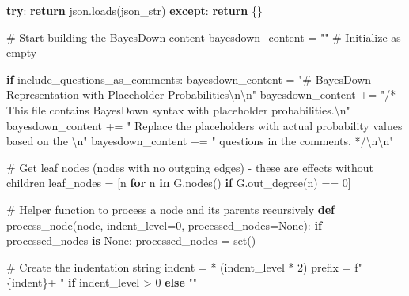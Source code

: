 \documentclass[
  11pt,
  letterpaper,
]{book}
\newenvironment{Shaded}{\begin{snugshade}}{\end{snugshade}}
\newcommand{\BuiltInTok}[1]{\textcolor[rgb]{0.00,0.23,0.31}{#1}}
\newcommand{\CharTok}[1]{\textcolor[rgb]{0.13,0.47,0.30}{#1}}
\newcommand{\CommentTok}[1]{\textcolor[rgb]{0.37,0.37,0.37}{#1}}
\newcommand{\ControlFlowTok}[1]{\textcolor[rgb]{0.00,0.23,0.31}{\textbf{#1}}}
\newcommand{\DecValTok}[1]{\textcolor[rgb]{0.68,0.00,0.00}{#1}}
\newcommand{\KeywordTok}[1]{\textcolor[rgb]{0.00,0.23,0.31}{\textbf{#1}}}
\newcommand{\NormalTok}[1]{\textcolor[rgb]{0.00,0.23,0.31}{#1}}
\newcommand{\OperatorTok}[1]{\textcolor[rgb]{0.37,0.37,0.37}{#1}}
\newcommand{\SpecialCharTok}[1]{\textcolor[rgb]{0.37,0.37,0.37}{#1}}
\newcommand{\SpecialStringTok}[1]{\textcolor[rgb]{0.13,0.47,0.30}{#1}}
\newcommand{\StringTok}[1]{\textcolor[rgb]{0.13,0.47,0.30}{#1}}
\newcommand{\VariableTok}[1]{\textcolor[rgb]{0.07,0.07,0.07}{#1}}
\begin{document}
\begin{Shaded}
\begin{Highlighting}[]
      \ControlFlowTok{try}\NormalTok{:}
          \ControlFlowTok{return}\NormalTok{ json.loads(json\_str)}
      \ControlFlowTok{except}\NormalTok{:}
          \ControlFlowTok{return}\NormalTok{ \{\}}

  \CommentTok{\# Start building the BayesDown content}
\NormalTok{  bayesdown\_content }\OperatorTok{=} \StringTok{""}  \CommentTok{\# Initialize as empty}

  \ControlFlowTok{if}\NormalTok{ include\_questions\_as\_comments:}
\NormalTok{    bayesdown\_content }\OperatorTok{=} \StringTok{"\# BayesDown Representation with Placeholder Probabilities}\CharTok{\textbackslash{}n\textbackslash{}n}\StringTok{"}
\NormalTok{    bayesdown\_content }\OperatorTok{+=} \StringTok{"/* This file contains BayesDown syntax with placeholder probabilities.}\CharTok{\textbackslash{}n}\StringTok{"}
\NormalTok{    bayesdown\_content }\OperatorTok{+=} \StringTok{"   Replace the placeholders with actual probability values based on the }\CharTok{\textbackslash{}n}\StringTok{"}
\NormalTok{    bayesdown\_content }\OperatorTok{+=} \StringTok{"   questions in the comments. */}\CharTok{\textbackslash{}n\textbackslash{}n}\StringTok{"}

  \CommentTok{\# Get leaf nodes (nodes with no outgoing edges) {-} these are effects without children}
\NormalTok{  leaf\_nodes }\OperatorTok{=}\NormalTok{ [n }\ControlFlowTok{for}\NormalTok{ n }\KeywordTok{in}\NormalTok{ G.nodes() }\ControlFlowTok{if}\NormalTok{ G.out\_degree(n) }\OperatorTok{==} \DecValTok{0}\NormalTok{]}

  \CommentTok{\# Helper function to process a node and its parents recursively}
  \KeywordTok{def}\NormalTok{ process\_node(node, indent\_level}\OperatorTok{=}\DecValTok{0}\NormalTok{, processed\_nodes}\OperatorTok{=}\VariableTok{None}\NormalTok{):}
      \ControlFlowTok{if}\NormalTok{ processed\_nodes }\KeywordTok{is} \VariableTok{None}\NormalTok{:}
\NormalTok{          processed\_nodes }\OperatorTok{=} \BuiltInTok{set}\NormalTok{()}

      \CommentTok{\# Create the indentation string}
\NormalTok{      indent }\OperatorTok{=} \StringTok{\textquotesingle{} \textquotesingle{}} \OperatorTok{*}\NormalTok{ (indent\_level }\OperatorTok{*} \DecValTok{2}\NormalTok{)}
\NormalTok{      prefix }\OperatorTok{=} \SpecialStringTok{f"}\SpecialCharTok{\{}\NormalTok{indent}\SpecialCharTok{\}}\SpecialStringTok{+ "} \ControlFlowTok{if}\NormalTok{ indent\_level }\OperatorTok{\textgreater{}} \DecValTok{0} \ControlFlowTok{else} \StringTok{""}


\end{Highlighting}
\end{Shaded}
\end{document}

